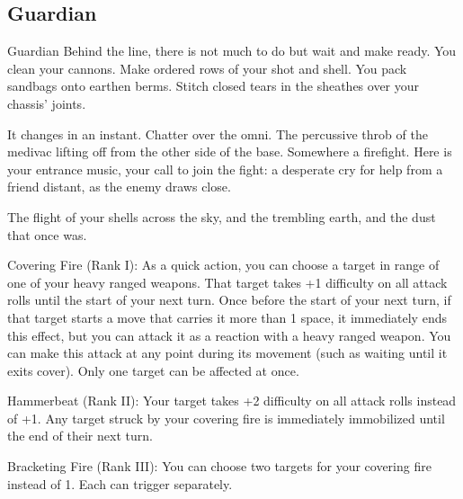 \subsection{Guardian}


                                                    Guardian  
Behind the line, there is not much to do but wait and make ready. You clean your cannons. Make  
ordered rows of your shot and shell. You pack sandbags onto earthen berms. Stitch closed tears  
in the sheathes over your chassis’ joints.   

It changes in an instant. Chatter over the omni. The percussive throb of the medivac lifting off  
from the other side of the base. Somewhere a firefight. Here is your entrance music, your call to  
join the fight: a desperate cry for help from a friend distant, as the enemy draws close.   

 The flight of your shells across the sky, and the trembling earth, and the dust that once was.
 
Covering Fire (Rank I): As a quick action, you can choose a target in range of one of your heavy  
ranged weapons. That target takes +1 difficulty on all attack rolls until the start of your next turn.  
Once before the start of your next turn, if that target starts a move that carries it more than 1  
space, it immediately ends this effect, but you can attack it as a reaction with a heavy ranged  
weapon. You can make this attack at any point during its movement (such as waiting until it exits  
cover). Only one target can be affected at once.
 
 Hammerbeat (Rank II): Your target takes +2 difficulty on all attack rolls instead of +1. Any target  
struck by your covering fire is immediately immobilized until the end of their next turn.
 
 Bracketing Fire (Rank III): You can choose two targets for your covering fire instead of 1. Each  
can trigger separately.